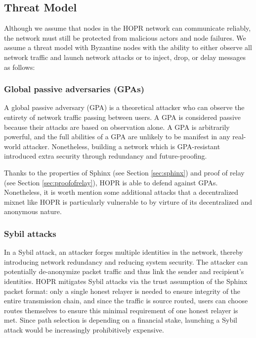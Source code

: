 \subsection{Threat Model}

Although we assume that nodes in the HOPR network can communicate reliably, the network must still be protected from malicious actors and node failures. We assume a threat model with Byzantine nodes with the ability to either observe all network traffic and launch network attacks or to inject, drop, or delay messages as follows:

\subsubsection{Global passive adversaries (GPAs)} A global passive adversary (GPA) is a theoretical attacker who can observe the entirety of network traffic passing between users. A GPA is considered passive because their attacks are based on observation alone. A GPA is arbitrarily powerful, and the full abilities of a GPA are unlikely to be manifest in any real-world attacker. Nonetheless, building a network which is GPA-resistant introduced extra security through redundancy and future-proofing.

Thanks to the properties of Sphinx (see Section \ref{sec:sphinx}) and proof of relay (see Section \ref{sec:proofofrelay}), HOPR is able to defend against GPAs. Nonetheless, it is worth mention some additional attacks that a decentralized mixnet like HOPR is particularly vulnerable to by virture of its decentralized and anonymous nature.

\subsubsection{Sybil attacks}
In a Sybil attack, an attacker forges multiple identities in the network, thereby introducing network redundancy and reducing system security. The attacker can potentially de-anonymize packet traffic and thus link the sender and recipient's identities. HOPR mitigates Sybil attacks via the trust assumption of the Sphinx packet format: only a single honest relayer is needed to ensure integrity of the entire transmission chain, and since the traffic is source routed, users can choose routes themselves to ensure this minimal requirement of one honest relayer is met. Since path selection is depending on a financial stake, launching a Sybil attack would be increasingly prohibitively expensive.

